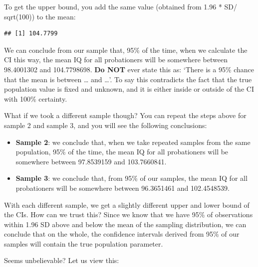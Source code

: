 \documentclass[
]{book}
\newenvironment{Shaded}{\begin{snugshade}}{\end{snugshade}}
\newcommand{\AttributeTok}[1]{\textcolor[rgb]{0.77,0.63,0.00}{#1}}
\newcommand{\ConstantTok}[1]{\textcolor[rgb]{0.00,0.00,0.00}{#1}}
\newcommand{\DecValTok}[1]{\textcolor[rgb]{0.00,0.00,0.81}{#1}}
\newcommand{\FloatTok}[1]{\textcolor[rgb]{0.00,0.00,0.81}{#1}}
\newcommand{\FunctionTok}[1]{\textcolor[rgb]{0.00,0.00,0.00}{#1}}
\newcommand{\NormalTok}[1]{#1}
\newcommand{\SpecialCharTok}[1]{\textcolor[rgb]{0.00,0.00,0.00}{#1}}
\providecommand{\tightlist}{%
  \setlength{\itemsep}{0pt}\setlength{\parskip}{0pt}}
\begin{document}
To get the upper bound, you add the same value (obtained from 1.96 * SD/ sqrt(100)) to the mean:

\begin{Shaded}
\end{Shaded}

\begin{verbatim}
## [1] 104.7799
\end{verbatim}

We can conclude from our sample that, 95\% of the time, when we calculate the CI this way, the mean IQ for all probationers will be somewhere between 98.4001302 and 104.7798698. \textbf{Do NOT} ever state this as: `There is a 95\% chance that the mean is between \ldots{} and \ldots{}'. To say this contradicts the fact that the true population value is fixed and unknown, and it is either inside or outside of the CI with 100\% certainty.

What if we took a different sample though? You can repeat the steps above for sample 2 and sample 3, and you will see the following conclusions:

\begin{itemize}
\tightlist
\item
  \textbf{Sample 2}: we conclude that, when we take repeated samples from the same population, 95\% of the time, the mean IQ for all probationers will be somewhere between 97.8539159 and 103.7660841.
\item
  \textbf{Sample 3}: we conclude that, from 95\% of our samples, the mean IQ for all probationers will be somewhere between 96.3651461 and 102.4548539.
\end{itemize}

With each different sample, we get a slightly different upper and lower bound of the CIs. How can we trust this? Since we know that we have 95\% of observations within 1.96 SD above and below the mean of the sampling distribution, we can conclude that on the whole, the confidence intervals derived from 95\% of our samples will contain the true population parameter.

Seems unbelievable? Let us view this:
\end{document}
